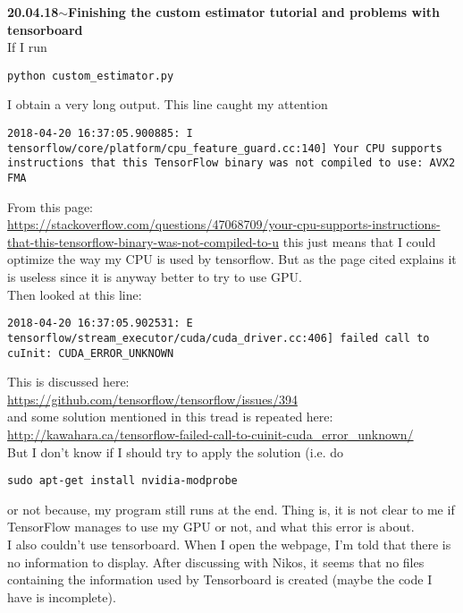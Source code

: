 \documentclass[11pt,a4paper]{article}
\newenvironment{loggentry}[2]%
{\noindent\textbf{#1}\hspace{1cm}$\mathbf{\sim}$\text{ }\textbf{#2}\\}{\vspace{0.5cm}}
\begin{document}
\begin{loggentry}{20.04.18}{Finishing the custom estimator tutorial and problems with tensorboard}
If I run
\begin{verbatim}
python custom_estimator.py
\end{verbatim}
I obtain a very long output. This line caught my attention\\
\begin{verbatim}
2018-04-20 16:37:05.900885: I tensorflow/core/platform/cpu_feature_guard.cc:140] Your CPU supports instructions that this TensorFlow binary was not compiled to use: AVX2 FMA
\end{verbatim}
From this page:\\
\url{https://stackoverflow.com/questions/47068709/your-cpu-supports-instructions-that-this-tensorflow-binary-was-not-compiled-to-u}
this just means that I could optimize the way my CPU is used by tensorflow. But as the page cited explains it is useless since it is anyway better to try to use GPU.\\
Then looked at this line:\\
\begin{verbatim}
2018-04-20 16:37:05.902531: E tensorflow/stream_executor/cuda/cuda_driver.cc:406] failed call to cuInit: CUDA_ERROR_UNKNOWN
\end{verbatim}
This is discussed here:\\
\url{https://github.com/tensorflow/tensorflow/issues/394}\\
and some solution mentioned in this tread is repeated here:\\
\url{http://kawahara.ca/tensorflow-failed-call-to-cuinit-cuda_error_unknown/}\\
But I don't know if I should try to apply the solution (i.e. do 
\begin{verbatim}
sudo apt-get install nvidia-modprobe
\end{verbatim}
or not because, my program still runs at the end. Thing is, it is not clear to me if TensorFlow manages to use my GPU or not, and what this error is about.\\


I also couldn't use tensorboard. When I open the webpage, I'm told that there is no information to display. After discussing with Nikos, it seems that no files containing the information used by Tensorboard is created (maybe the code I have is incomplete).
\end{loggentry}
\end{document}
